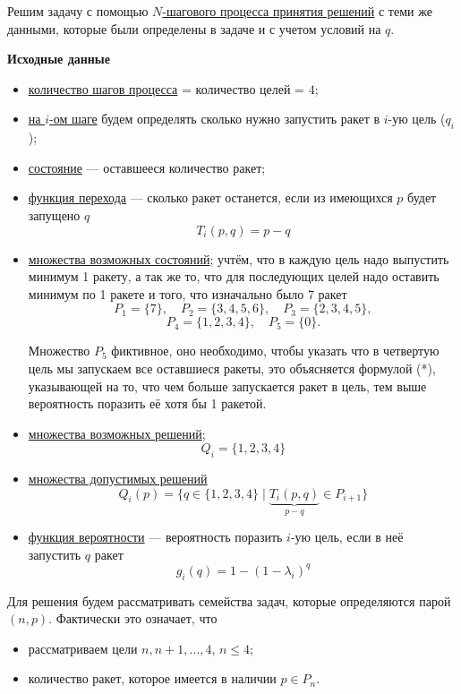 Решим задачу с помощью \hyperref[def:n_step_process]{$N$-шагового процесса принятия решений} с теми же данными, которые были определены в задаче и с учетом условий на $q$.

\bigskip

\textbf{Исходные данные}
\begin{itemize}[nosep]
	\item \underline{количество шагов процесса} = количество целей = $4$;
	
	\item \underline{на $i$-ом шаге} будем определять сколько нужно запустить ракет в $i$-ую цель ($q_i$);
	
	\item \underline{состояние} --- оставшееся количество ракет;
	
	\item \underline{функция перехода} --- сколько ракет останется, если из имеющихся $p$ будет запущено $q$
	\[T_i(p, q) = p - q\]
	
	\item \underline{множества возможных состояний}; учтём, что в каждую цель надо выпустить минимум 1 ракету, а так же то, что для последующих целей надо оставить минимум по 1 ракете и того, что изначально было 7 ракет
	\[
	P_1 = \{7\}, \quad P_2 = \{3, 4, 5, 6\}, \quad P_3 = \{2, 3, 4, 5\},
	\]
	\[
	P_4 = \{1, 2, 3, 4\}, \quad P_5 = \{0\}.
	\]
	
	Множество $P_5$ фиктивное, оно необходимо, чтобы указать что в четвертую цель мы запускаем все оставшиеся ракеты, это объясняется формулой (*), указывающей на то, что чем больше запускается ракет в цель, тем выше вероятность поразить её хотя бы 1 ракетой.
	
	\item \underline{множества возможных решений};
	\[Q_i = \{1, 2, 3, 4\}\]
	
	\item \underline{множества допустимых решений}
	\[Q_i(p) = \{q \in \{1, 2, 3, 4\} \; \big| \; \underbrace{T_i(p, q)}_{p - q} \in P_{i + 1} \}\]
	
	\item \underline{функция вероятности} --- вероятность поразить $i$-ую цель, если в неё запустить $q$ ракет
	\[g_i(q) = 1 - (1 - \lambda_i)^{q}\]
\end{itemize}

Для решения будем рассматривать семейства задач, которые определяются парой $(n, p)$. Фактически это означает, что

\begin{itemize}[nosep]
	\item рассматриваем цели $n, n+1, \dots, 4$, $n \le 4$;
	
	\item количество ракет, которое имеется в наличии $p \in P_n$.
\end{itemize}

